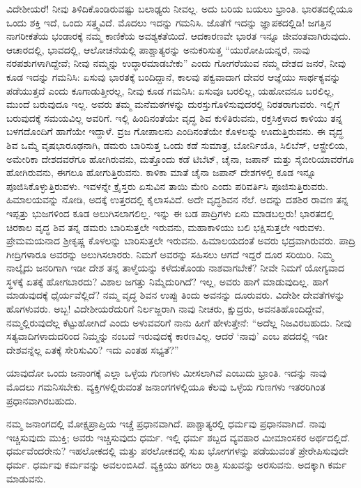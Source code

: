 ವಿದೇಶೀಯರೆ! ನೀವು ತಿಳಿದಿಕೊಂಡಿರುವಷ್ಟು ಬಲಾಢ್ಯರು ನೀವಲ್ಲ. ಅದು ಬರಿಯ ಬಯಲು ಭ್ರಾಂತಿ. ಭಾರತದಲ್ಲಿಯೂ ಒಂದು ಶಕ್ತಿ ಇದೆ, ಒಂದು ಸತ್ತ್ವವಿದೆ. ಮೊದಲು ಇದನ್ನು ಗಮನಿಸಿ. ಜೊತೆಗೆ ಇದನ್ನು ಜ್ಞಾಪಕದಲ್ಲಿಡಿ! ಜಗತ್ತಿನ ನಾಗರೀಕತೆಯ ಭಂಡಾರಕ್ಕೆ ನಮ್ಮ ಕಾಣಿಕೆಯ ಅವಶ್ಯಕತೆಯಿದೆ. ಆದಕಾರಣವೇ ಭಾರತ ಇನ್ನೂ ಜೀವಂತವಾಗಿರುವುದು. ಆಚಾರದಲ್ಲಿ, ಭಾವದಲ್ಲಿ, ಆಲೋಚನೆಯಲ್ಲಿ ಪಾಶ್ಚಾತ್ಯರನ್ನು ಅನುಕರಿಸುತ್ತ “ಯುರೋಪಿ\break ಯನ್ನರೆ, ನಾವು ನರಪಶುಗಳಾಗಿದ್ದೇವೆ; ನೀವು ನಮ್ಮನ್ನು ಉದ್ಧಾರಮಾಡಬೇಕು” ಎಂದು ಗೋಗರೆಯುವ ನಮ್ಮ ದೇಶದ ಜನರೆ, ನೀವು ಕೂಡ ಇದನ್ನು ಗಮನಿಸಿ: ಏಸುವು ಭಾರತಕ್ಕೆ ಬಂದಿದ್ದಾನೆ, ಕಾಲವು ಪಕ್ವವಾದಾಗ ದೇವರ ಆಜ್ಞೆಯು ಸಾರ್ಥಕ್ಯವನ್ನು ಪಡೆಯುತ್ತದೆ ಎಂದು ಕೂಗಾಡುತ್ತೀರಲ್ಲ, ನೀವು ಕೂಡ ಗಮನಿಸಿ: ಏಸುವೂ ಬರಲಿಲ್ಲ, ಯಹೋವನೂ ಬರಲಿಲ್ಲ, ಮುಂದೆ ಬರುವುದೂ ಇಲ್ಲ. ಅವರು ತಮ್ಮ ಮನೆಮಠಗಳನ್ನು ದುರಸ್ತುಗೊಳಿಸು\break ವುದರಲ್ಲಿ ನಿರತರಾಗುವರು. ಇಲ್ಲಿಗೆ ಬರುವುದಕ್ಕೆ ಸಮಯವಿಲ್ಲ ಅವರಿಗೆ. ಇಲ್ಲಿ ಹಿಂದಿನಂತೆಯೇ ವೃದ್ಧ ಶಿವ ಕುಳಿತಿರುವನು, ರಕ್ತಸಿಕ್ತಳಾದ ಕಾಳಿಯು ತನ್ನ ಬಳಗದೊಂದಿಗೆ ಹಾಗೆಯೇ ಇದ್ದಾಳೆ. ವ್ರಜ ಗೋಪಾಲನು ಎಂದಿನಂತೆಯೇ ಕೊಳಲನ್ನು ಊದುತ್ತಿರುವನು. ಈ ವೃದ್ಧ ಶಿವ ಒಮ್ಮೆ ವೃಷಭಾರೂಢನಾಗಿ, ಡಮರು ಬಾರಿಸುತ್ತ ಒಂದು ಕಡೆ ಸುಮಾತ್ರ, ಬೋರ್ನಿಯೊ, ಸಿಲಿಬೆಸ್​, ಆಸ್ಟ್ರೇಲಿಯ, ಅಮೇರಿಕಾ ದೇಶದವರೆಗೂ ಹೋಗಿರುವನು, ಮತ್ತೊಂದು ಕಡೆ ಟಿಬೆಟ್​, ಚೈನಾ, ಜಪಾನ್​ ಮತ್ತು ಸೈಬೀರಿಯಾವರೆಗೂ ಹೋಗಿರುವನು, ಈಗಲೂ ಹೋಗುತ್ತಿರುವನು. ಕಾಳಿಕಾ ಮಾತೆ ಚೈನಾ ಜಪಾನ್​ ದೇಶಗಳಲ್ಲಿ ಕೂಡ ಇನ್ನೂ ಪೂಜಿಸಿಕೊಳ್ಳುತ್ತಿರುವಳು. ಇವಳನ್ನೇ ಕ್ರೈಸ್ತರು ಏಸುವಿನ ತಾಯಿ ಮೇರಿ ಎಂದು ಪರಿವರ್ತಿಸಿ ಪೂಜಿಸುತ್ತಿರುವರು. ಹಿಮಾಲಯವನ್ನು ನೋಡಿ, ಅದಕ್ಕೆ ಉತ್ತರದಲ್ಲಿ ಕೈಲಾಸವಿದೆ. ಅದೇ ವೃದ್ಧಶಿವನ ನೆಲೆ. ಅದನ್ನು ದಶಶಿರ ರಾವಣ ತನ್ನ ಇಪ್ಪತ್ತು ಭುಜಗಳಿಂದ ಕೂಡ ಅಲುಗಿಸಲಾಗ\break ಲಿಲ್ಲ. ಇನ್ನು ಈ ಬಡ ಪಾದ್ರಿಗಳು ಏನು ಮಾಡಬಲ್ಲರು! ಭಾರತದಲ್ಲಿ ಚಿರಕಾಲ ವೃದ್ಧ ಶಿವ ತನ್ನ ಡಮರು ಬಾರಿಸುತ್ತಲೇ ಇರುವನು, ಮಹಾಕಾಳಿಯು ಬಲಿ ಭಕ್ಷಿಸುತ್ತಲೇ ಇರುವಳು. ಪ್ರೇಮಮಯನಾದ ಶ‍್ರೀಕೃಷ್ಣ ಕೊಳಲನ್ನು ಬಾರಿಸುತ್ತಲೇ ಇರುವನು. ಹಿಮಾಲಯದಂತೆ ಅವರು ಭದ್ರವಾಗಿರುವರು. ಪಾದ್ರಿ ಗೀದ್ರಿಗಳಾರೂ ಅವರನ್ನು ಅಲುಗಿಸಲಾರರು. ನಿಮಗೆ ಅವರನ್ನು ಸಹಿಸಲು ಆಗದೆ ಇದ್ದರೆ ದೂರ ಸರಿಯಿರಿ. ನಿಮ್ಮ ನಾಲ್ಕೈದು ಜನರಿಗಾಗಿ ಇಡೀ ದೇಶ ತನ್ನ ತಾಳ್ಮೆಯನ್ನು ಕಳೆದುಕೊಂಡು ನಾಶವಾಗಬೇಕೆ? ನೀವೇ ನಿಮಗೆ ಯೋಗ್ಯವಾದ ಸ್ಥಳಕ್ಕೆ ಏತಕ್ಕೆ ಹೋಗಬಾರದು? ವಿಶಾಲ ಜಗತ್ತು ನಿಮ್ಮೆದುರಿಗಿದೆ? ಇಲ್ಲ, ಅವರು ಹಾಗೆ ಮಾಡುವುದಿಲ್ಲ. ಹಾಗೆ ಮಾಡುವುದಕ್ಕೆ ಧೈರ್ಯವೆಲ್ಲಿದೆ? ನಮ್ಮ ವೃದ್ಧ ಶಿವನ ಉಪ್ಪು ತಿಂದು ಅವನನ್ನು ದೂರುವರು. ವಿದೇಶೀ ದೇವತೆಗಳನ್ನು ಹೊಗಳುವರು. ಅಬ್ಬ! ವಿದೇಶೀಯರೆದುರಿಗೆ ನಿರ್ಲಜ್ಜರಾಗಿ ನಾವು ನೀಚರು, ಕ್ಷುದ್ರರು, ಅವನತಿಹೊಂದಿದ್ದೇವೆ, ನಮ್ಮಲ್ಲಿರುವುದೆಲ್ಲ ಕೆಟ್ಟುಹೋಗಿದೆ ಎಂದು ಅಳುವವರಿಗೆ ನಾನು ಹೀಗೆ ಹೇಳುತ್ತೇನೆ: “ಅದೆಲ್ಲ ನಿಜವಿರಬಹುದು. ನೀವು ಸತ್ಯವಾದಿಗಳಾದುದರಿಂದ ನಿಮ್ಮನ್ನು ನಂಬದೆ ಇರುವುದಕ್ಕೆ ಕಾರಣವಿಲ್ಲ. ಆದರೆ ‘ನಾವು’ ಎಂಬ ಪದದಲ್ಲಿ ಇಡೀ ದೇಶವನ್ನೆಲ್ಲ ಏತಕ್ಕೆ ಸೇರಿಸುವಿರಿ? ಇದು ಎಂತಹ ಸಭ್ಯತೆ?”

ಯಾವುದೋ ಒಂದು ಜನಾಂಗಕ್ಕೆ ಎಲ್ಲಾ ಒಳ್ಳೆಯ ಗುಣಗಳು ಮೀಸಲಾಗಿವೆ ಎಂಬುದು ಭ್ರಾಂತಿ. ಇದನ್ನು ನಾವು ಮೊದಲು ಗಮನಿಸಬೇಕು. ವ್ಯಕ್ತಿಗಳಲ್ಲಿರುವಂತೆ ಜನಾಂಗಗಳಲ್ಲಿಯೂ ಕೆಲವು ಒಳ್ಳೆಯ ಗುಣಗಳು ಇತರರಿಗಿಂತ ಪ್ರಧಾನವಾಗಿರಬಹುದು.

ನಮ್ಮ ಜನಾಂಗದಲ್ಲಿ ಮೋಕ್ಷಪ್ರಾಪ್ತಿಯ ಇಚ್ಚೆ ಪ್ರಧಾನವಾಗಿದೆ. ಪಾಶ್ಚಾತ್ಯರಲ್ಲಿ ಧರ್ಮವು ಪ್ರಧಾನವಾಗಿದೆ. ನಾವು ಇಚ್ಚಿಸುವುದು ಮುಕ್ತಿ; ಅವರು ಇಚ್ಚಿಸುವುದು ಧರ್ಮ. ಇಲ್ಲಿ ಧರ್ಮ ಶಬ್ದದ ವ್ಯವಹಾರ ಮೀಮಾಂಸಕರ ಅರ್ಥದಲ್ಲಿದೆ. ಧರ್ಮವೆಂದರೇನು? ಇಹಲೋಕದಲ್ಲಿ ಮತ್ತು ಪರಲೋಕದಲ್ಲಿ ಸುಖ ಭೋಗಗಳನ್ನು ಪಡೆಯುವಂತೆ ಪ್ರೇರೇಪಿಸುವುದೇ ಧರ್ಮ. ಧರ್ಮವು ಕರ್ಮವನ್ನು ಅವಲಂಬಿಸಿದೆ. ವ್ಯಕ್ತಿಯು ಹಗಲು ರಾತ್ರಿ ಸುಖವನ್ನು ಅರಸುವನು. ಅದಕ್ಕಾಗಿ ಕರ್ಮ ಮಾಡುವನು.

